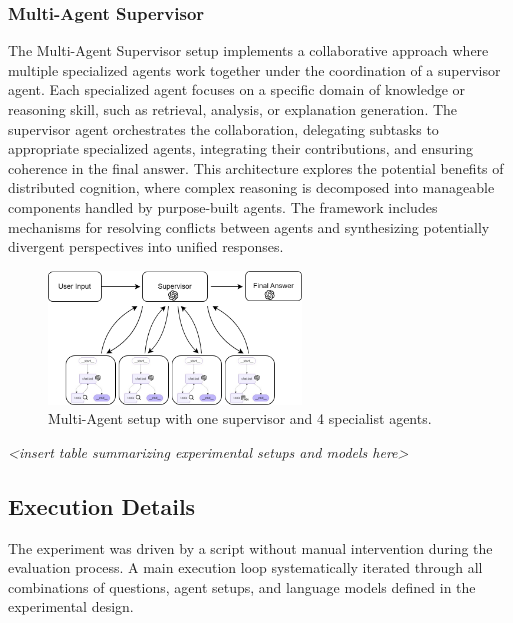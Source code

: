             \subsubsection{Multi-Agent Supervisor}

                The Multi-Agent Supervisor setup implements a collaborative approach where multiple specialized agents work together under the coordination of a supervisor agent. Each specialized agent focuses on a specific domain of knowledge or reasoning skill, such as retrieval, analysis, or explanation generation. The supervisor agent orchestrates the collaboration, delegating subtasks to appropriate specialized agents, integrating their contributions, and ensuring coherence in the final answer. This architecture explores the potential benefits of distributed cognition, where complex reasoning is decomposed into manageable components handled by purpose-built agents. The framework includes mechanisms for resolving conflicts between agents and synthesizing potentially divergent perspectives into unified responses.

                \begin{figure}[h]
                    \centering
                    \includegraphics[width=0.6\textwidth]{images_exp2/diagrama_multiagente_supervisor.png}
                    \caption{Multi-Agent setup with one supervisor and 4 specialist agents.}
                    \label{fig:diagrama_multiagente_supervisor}
                \end{figure}


                \textit{<insert table summarizing experimental setups and models here>}

        \subsection{Execution Details}

            The experiment was driven by a script without manual intervention during the evaluation process. A main execution loop systematically iterated through all combinations of questions, agent setups, and language models defined in the experimental design. 

